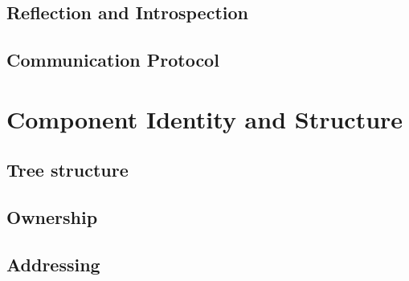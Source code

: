 \documentclass[12pt]{scrartcl}
\begin{document}
\subsection{Reflection and Introspection}





\subsection{Communication Protocol} 





\section{Component Identity and Structure} 


\subsection{Tree structure} 




\subsection{Ownership}



\subsection{Addressing}


\end{document}
